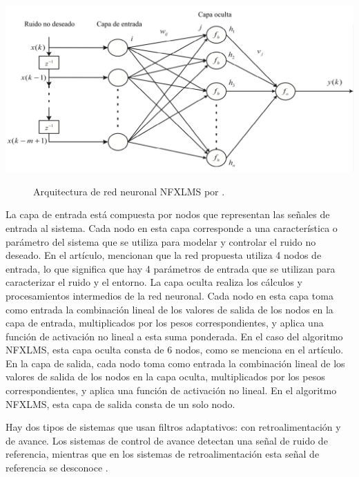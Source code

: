 \documentclass[a4paper,12pt]{article}
\begin{document}
\begin{center}
    \includegraphics[width=\linewidth]{images/NFXLMS.png}
\end{center}
\vspace{\captionSpace}
\begin{figure}[H]
    \caption{Arquitectura de red neuronal NFXLMS por \textcite[][3]{Chang2007}.}
    \label{fig:Chang2007}
\end{figure}

La capa de entrada está compuesta por nodos que representan las señales de entrada al sistema.
Cada nodo en esta capa corresponde a una característica o parámetro del sistema que se utiliza para modelar y controlar el ruido no deseado.
En el artículo, mencionan que la red propuesta utiliza 4 nodos de entrada, lo que significa que hay 4 parámetros de entrada que se utilizan para caracterizar el ruido y el entorno.
La capa oculta realiza los cálculos y procesamientos intermedios de la red neuronal.
Cada nodo en esta capa toma como entrada la combinación lineal de los valores de salida de los nodos en la capa de entrada, multiplicados por los pesos correspondientes, y aplica una función de activación no lineal a esta suma ponderada.
En el caso del algoritmo NFXLMS, esta capa oculta consta de 6 nodos, como se menciona en el artículo.
En la capa de salida, cada nodo toma como entrada la combinación lineal de los valores de salida de los nodos en la capa oculta, multiplicados por los pesos correspondientes, y aplica una función de activación no lineal.
En el algoritmo NFXLMS, esta capa de salida consta de un solo nodo.

Hay dos tipos de sistemas que usan filtros adaptativos: con retroalimentación y de avance.
Los sistemas de control de avance detectan una señal de ruido de referencia, mientras que en los sistemas de retroalimentación esta señal de referencia se desconoce \parencite{Salmasi2011}.
\end{document}
